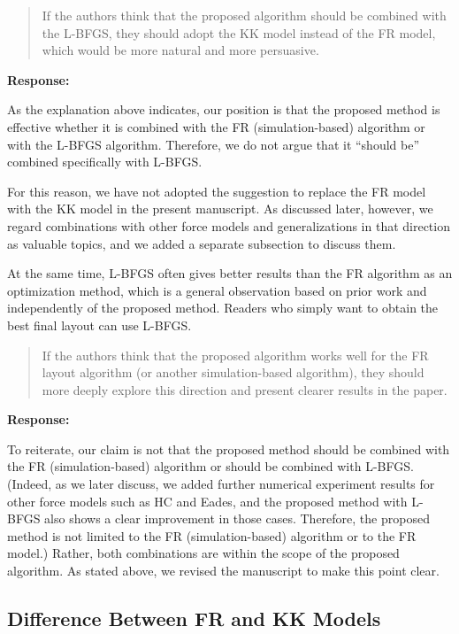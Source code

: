 \documentclass[11pt]{article}
\newcommand{\reviewercomment}[1]{%
  \begin{quote}
  \color{blue}
  #1
  \end{quote}
}
\newenvironment{response}{%
  \noindent\textbf{Response:}%
}{%
  \medskip
}
\begin{document}
\reviewercomment{
  If the authors think that the proposed algorithm should be combined with the L-BFGS, they should adopt the KK model instead of the FR model, which would be more natural and more persuasive.
}

\begin{response}
  As the explanation above indicates, our position is that the proposed method is effective whether it is combined with the FR (simulation-based) algorithm or with the L-BFGS algorithm. Therefore, we do not argue that it ``should be'' combined specifically with L-BFGS.

  For this reason, we have not adopted the suggestion to replace the FR model with the KK model in the present manuscript. As discussed later, however, we regard combinations with other force models and generalizations in that direction as valuable topics, and we added a separate subsection to discuss them.

  At the same time, L-BFGS often gives better results than the FR algorithm as an optimization method, which is a general observation based on prior work and independently of the proposed method.
  Readers who simply want to obtain the best final layout can use L-BFGS.
\end{response}

\reviewercomment{
  If the authors think that the proposed algorithm works well for the FR layout algorithm (or another simulation-based algorithm), they should more deeply explore this direction and present clearer results in the paper.
}

\begin{response}
  To reiterate, our claim is not that the proposed method should be combined with the FR (simulation-based) algorithm or should be combined with L-BFGS.
  (Indeed, as we later discuss, we added further numerical experiment results for other force models such as HC and Eades, and the proposed method with L-BFGS also shows a clear improvement in those cases. Therefore, the proposed method is not limited to the FR (simulation-based) algorithm or to the FR model.)
  Rather, both combinations are within the scope of the proposed algorithm. As stated above, we revised the manuscript to make this point clear.
\end{response}

\subsection{Difference Between FR and KK Models}
\end{document}

